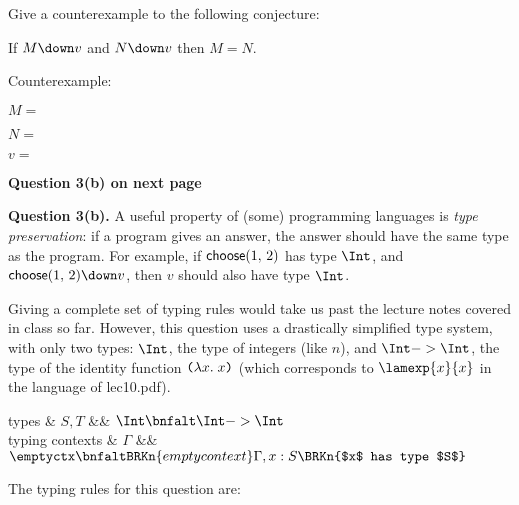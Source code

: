 \vspace*{2ex}

Give a counterexample to the following conjecture:

\begin{conjecture}
  If $M \down v$ and $N \down v$ then $M = N$.
\end{conjecture}

Counterexample:

\bigskip

$M =
$ \bigskip

$N =
$\bigskip

$v =
$

\vfill

\textbf{Question 3(b) on next page}

\clearpage

\textbf{Question 3(b).}
A useful property of (some) programming languages is \emph{type preservation}:
if a program gives an answer, the answer should have the same type as the program.
For example, if $\textsf{choose}({1},\,{2})$ has type $\Int$, and $\DC{1}{2} \down v$, then
$v$ should also have type $\Int$.

Giving a complete set of typing rules would take us past the lecture notes covered
in class so far.  However, this question uses a drastically simplified type system,
with only two
types: $\Int$, the type of integers (like $n$), and $\Int -> \Int$, the type of the
identity function $\texttt(\lambda{x}.\;{x}\texttt)$ (which corresponds to $\lamexp{x}{x}$ in the
language of lec10.pdf).

\begin{grammar}
 types & $S, T$
   &\bnfas&
   $\Int
   \bnfalt
   \Int -> \Int
   $
\\[1ex]
typing contexts & $\Gamma$
&\bnfas&
$
\emptyctx
\bnfaltBRKn{empty context}
\Gamma, x : S
\BRKn{$x$ has type $S$}
$
\end{grammar}

The typing rules for this question are:

\medskip


